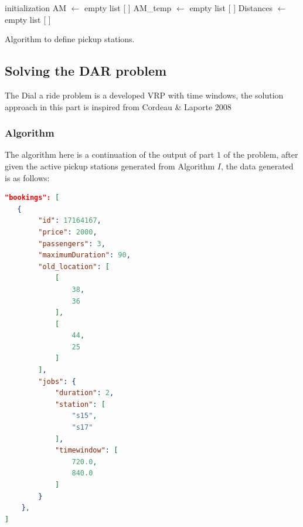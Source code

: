 \documentclass{article}
\begin{document}
\begin{algorithm}[H]
\label{alg:pickup_station}
\SetAlgoLined
\LinesNumbered
{}
\BlankLine
 initialization\;
AM $\leftarrow$ empty list [ ]\;
AM\_temp $\leftarrow$ empty list [ ]\;
Distances $\leftarrow$ empty list [ ]\;
\caption{Algorithm to define pickup stations.}
\end{algorithm}



\subsection{Solving the DAR problem}

The Dial a ride problem is a developed VRP with time windows, the solution approach in this part is inspired from Cordeau \& Laporte 2008 \cite{2008_Cordeau_Laporte}

\subsubsection{Algorithm}

The algorithm here is a continuation of the output of part $1$ of the problem, after given the active pickup stations generated from Algorithm $I$, the data generated is as follows:
\begin{lstlisting}[language=json,firstnumber=1]
"bookings": [
   {
        "id": 17164167,
        "price": 2000,
        "passengers": 3,
        "maximumDuration": 90,
        "old_location": [
            [
                38,
                36
            ],
            [
                44,
                25
            ]
        ],
        "jobs": {
            "duration": 2,
            "station": [
                "s15",
                "s17"
            ],
            "timewindow": [
                720.0,
                840.0
            ]
        }
    },
]
\end{lstlisting}
 
\end{document}
